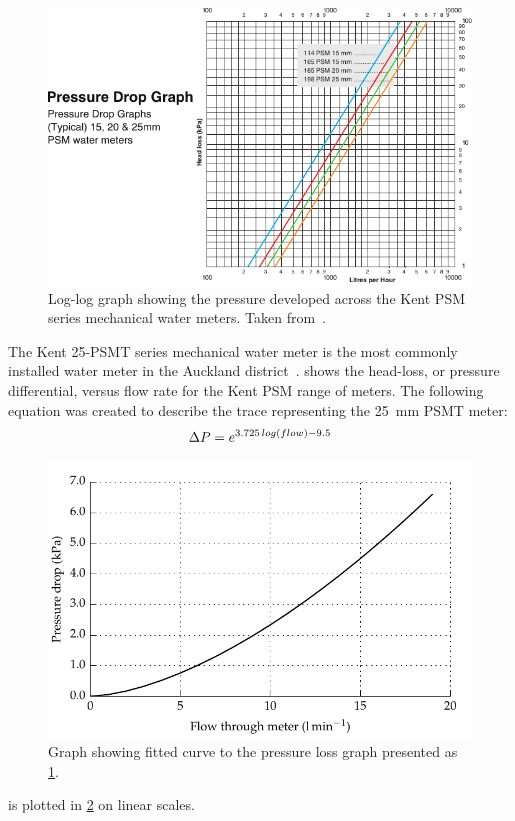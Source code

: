     \begin{figure}
        \centering
        \includegraphics[width=\linewidth]{content/pt1/02-WirelessWaterMeter/graphics/Kent-PSM-HeadLoss}
        \caption{
            \label{fig:headloss}
            Log-log graph showing the pressure developed across the Kent PSM series mechanical water meters. Taken from~\cite{Elster2008}.
        }
    \end{figure}
    The Kent 25-PSMT series mechanical water meter is the most commonly installed water meter in the Auckland district~\cite{WatercareNewZealand2014}.
     shows the head-loss, or pressure differential, versus flow rate for the Kent PSM range of meters.
    The following equation was created to describe the trace representing the \SI{25}{\milli\meter} PSMT meter:
    \begin{equation}
        \Delta P = e^{3.725\thinspace log(flow) - 9.5}
        \label{eqn:Flow_to_pressure_25mmPSMT}
    \end{equation}
    \begin{figure}
        \centering
        \includegraphics[width=\linewidth]{content/pt1/02-WirelessWaterMeter/graphics/graph_pressureLoss}
        \caption{Graph showing fitted curve to the pressure loss graph presented as \cref{fig:headloss}.}
        \label{fig:headloss_fit}
    \end{figure}
     is plotted in \cref{fig:headloss_fit} on linear scales.


